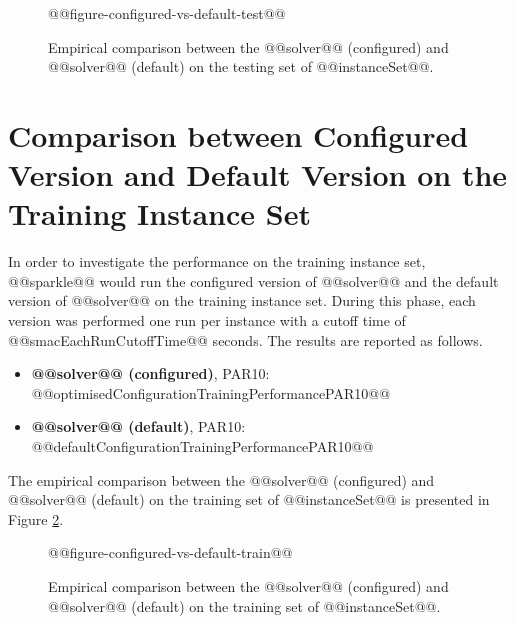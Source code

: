\documentclass[british]{article}
\begin{document}
\begin{figure}[htbp]
\noindent \begin{centering}
@@figure-configured-vs-default-test@@
\par\end{centering}

\caption{Empirical comparison between the @@solver@@ (configured) and @@solver@@ (default) on the testing set of @@instanceSet@@.}\label{fig:configured_vs_default_test}
\end{figure}


\section{Comparison between Configured Version and Default Version on the Training Instance Set}
In order to investigate the performance on the training instance set, @@sparkle@@ would run the configured version of @@solver@@ and the default version of @@solver@@ on the training instance set. During this phase, each version was performed one run per instance with a cutoff time of @@smacEachRunCutoffTime@@ seconds. The results are reported as follows.

\begin{itemize}
\item \textbf{@@solver@@ (configured)}, PAR10: @@optimisedConfigurationTrainingPerformancePAR10@@
\item \textbf{@@solver@@ (default)}, PAR10: @@defaultConfigurationTrainingPerformancePAR10@@
\end{itemize}

The empirical comparison between the @@solver@@ (configured) and @@solver@@ (default) on the training set of @@instanceSet@@ is presented in Figure \ref{fig:configured_vs_default_train}.

\begin{figure}[htbp]
\noindent \begin{centering}
@@figure-configured-vs-default-train@@
\par\end{centering}

\caption{Empirical comparison between the @@solver@@ (configured) and @@solver@@ (default) on the training set of @@instanceSet@@.}\label{fig:configured_vs_default_train}
\end{figure}




\end{document}
